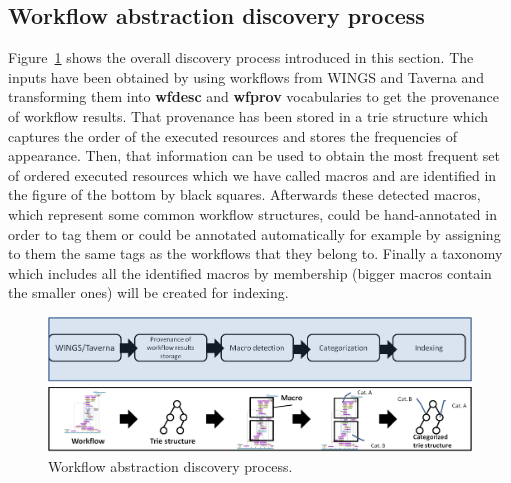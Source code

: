 \subsection{Workflow abstraction discovery process}
Figure~\ref{fig:workflowAbstraction} shows the overall discovery process introduced in this section. The inputs have been obtained by using workflows from WINGS and Taverna and transforming them into \textbf{wfdesc} and \textbf{wfprov} vocabularies to get the provenance of workflow results. That provenance has been stored in a trie structure which captures the order of the executed resources and stores the frequencies of appearance. Then, that information can be used to obtain the most frequent set of ordered executed resources which we have called macros and are identified in the figure of the bottom by black squares. Afterwards these detected macros, which represent some common workflow structures, could be hand-annotated in order to tag them or could be annotated automatically for example by assigning to them the same tags as the workflows that they belong to. Finally a taxonomy which includes all the identified macros by membership (bigger macros contain the smaller ones) will be created for indexing.


\begin{figure}
\begin{center}
	\includegraphics[scale=0.5]{./Figures/workflowAbstraction}
		\caption{Workflow abstraction discovery process.}
		\label{fig:workflowAbstraction}
\end{center}
\end{figure}
